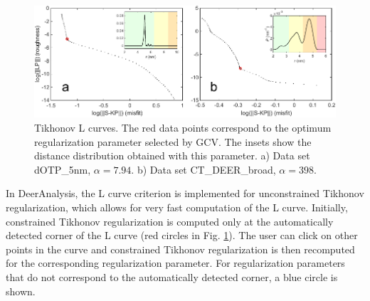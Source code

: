 \documentclass{article}
\begin{document}
\begin{figure}[ht]
 	\begin{center}
  \includegraphics[width=1.0\textwidth]{fig6.pdf}
	\end{center}
	\caption{Tikhonov L curves. The red data points correspond to the optimum regularization parameter selected by GCV. The insets show the distance distribution obtained with this parameter. a) Data set dOTP\_5nm, $\alpha = 7.94$. b) Data set CT\_DEER\_broad, $\alpha = 398$.}
	\label{fig:manfig6}
\end{figure}

In DeerAnalysis, the L curve criterion is implemented for unconstrained Tikhonov regularization, which allows for very fast computation of the L curve. Initially, constrained Tikhonov regularization is computed only at the automatically detected corner of the L curve (red circles in Fig. \ref{fig:manfig6}). The user can click on other points in the curve and constrained Tikhonov regularization is then recomputed for the corresponding regularization parameter. For regularization parameters that do not correspond to the automatically detected corner, a blue circle is shown.
\end{document}

